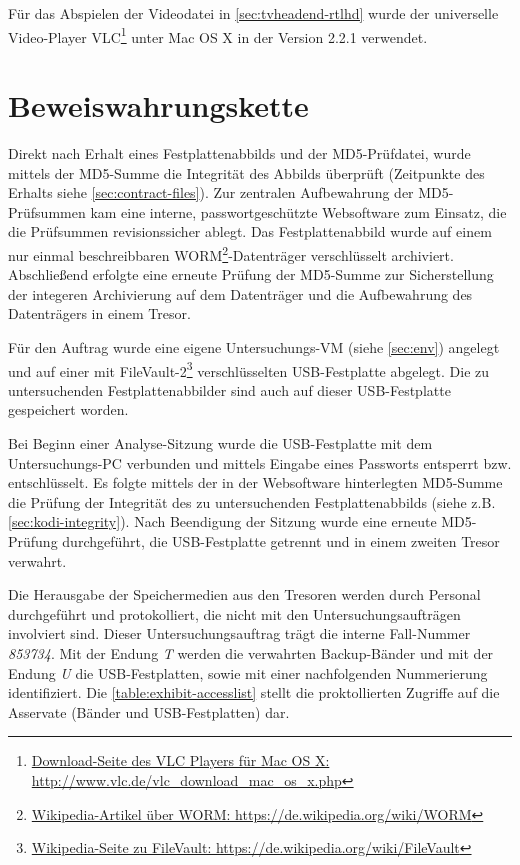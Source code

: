 Für das Abspielen der Videodatei in \autoref{sec:tvheadend-rtlhd} wurde der universelle Video-Player VLC\footnote{\href{http://www.vlc.de/vlc\_download\_mac\_os\_x.php}{Download-Seite des VLC Players für Mac OS X: http://www.vlc.de/vlc\_download\_mac\_os\_x.php}} unter Mac OS X in der Version 2.2.1 verwendet.

\section{Beweiswahrungskette}
\label{sec:cod}

Direkt nach Erhalt eines Festplattenabbilds und der MD5-Prüfdatei, wurde mittels der MD5-Summe die Integrität des Abbilds überprüft (Zeitpunkte des Erhalts siehe \autoref{sec:contract-files}). Zur zentralen Aufbewahrung der MD5-Prüfsummen kam eine interne, passwortgeschützte Websoftware zum Einsatz, die die Prüfsummen revisionssicher ablegt. Das Festplattenabbild wurde auf einem nur einmal beschreibbaren WORM\footnote{\href{https://de.wikipedia.org/wiki/WORM}{Wikipedia-Artikel über WORM: https://de.wikipedia.org/wiki/WORM}}-Datenträger verschlüsselt archiviert. Abschließend erfolgte eine erneute Prüfung der MD5-Summe zur Sicherstellung der integeren Archivierung auf dem Datenträger und die Aufbewahrung des Datenträgers in einem Tresor.

Für den Auftrag wurde eine eigene Untersuchungs-VM (siehe \autoref{sec:env}) angelegt und auf einer mit FileVault-2\footnote{\href{https://de.wikipedia.org/wiki/FileVault}{Wikipedia-Seite zu FileVault: https://de.wikipedia.org/wiki/FileVault}} verschlüsselten USB-Festplatte abgelegt. Die zu untersuchenden Festplattenabbilder sind auch auf dieser USB-Festplatte gespeichert worden.

Bei Beginn einer Analyse-Sitzung wurde die USB-Festplatte mit dem Untersuchungs-PC verbunden und mittels Eingabe eines Passworts entsperrt bzw. entschlüsselt. Es folgte  mittels der in der Websoftware hinterlegten MD5-Summe die Prüfung der Integrität des zu untersuchenden Festplattenabbilds (siehe z.B. \autoref{sec:kodi-integrity}). Nach Beendigung der Sitzung wurde eine erneute MD5-Prüfung durchgeführt, die USB-Festplatte getrennt und in einem zweiten Tresor verwahrt.

Die Herausgabe der Speichermedien aus den Tresoren werden durch Personal durchgeführt und protokolliert, die nicht mit den Untersuchungsaufträgen involviert sind. Dieser Untersuchungsauftrag trägt die interne Fall-Nummer \textit{853734}. Mit der Endung \textit{T} werden die verwahrten Backup-Bänder und mit der Endung \textit{U} die USB-Festplatten, sowie mit einer nachfolgenden Nummerierung identifiziert. Die \autoref{table:exhibit-accesslist} stellt die proktollierten Zugriffe auf die Asservate (Bänder und USB-Festplatten) dar.

